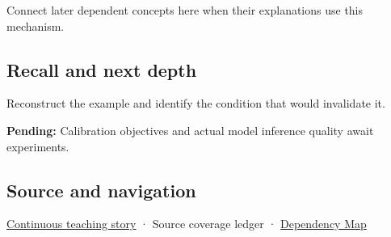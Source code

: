 Connect later dependent concepts here when their explanations use this mechanism.

\subsection{Recall and next depth}\label{appendix-d5da3eaabaef-recall-and-next-depth}

Reconstruct the example and identify the condition that would invalidate it.

\textbf{Pending:} Calibration objectives and actual model inference quality await experiments.

\subsection{Source and navigation}\label{appendix-d5da3eaabaef-source-and-navigation}

\hyperref[01-foundations-i-ch001-choosing-what-information-to-keep]{Continuous teaching story} · {Source coverage ledger} · \hyperref[appendix-4ad47bdd269a]{Dependency Map}
